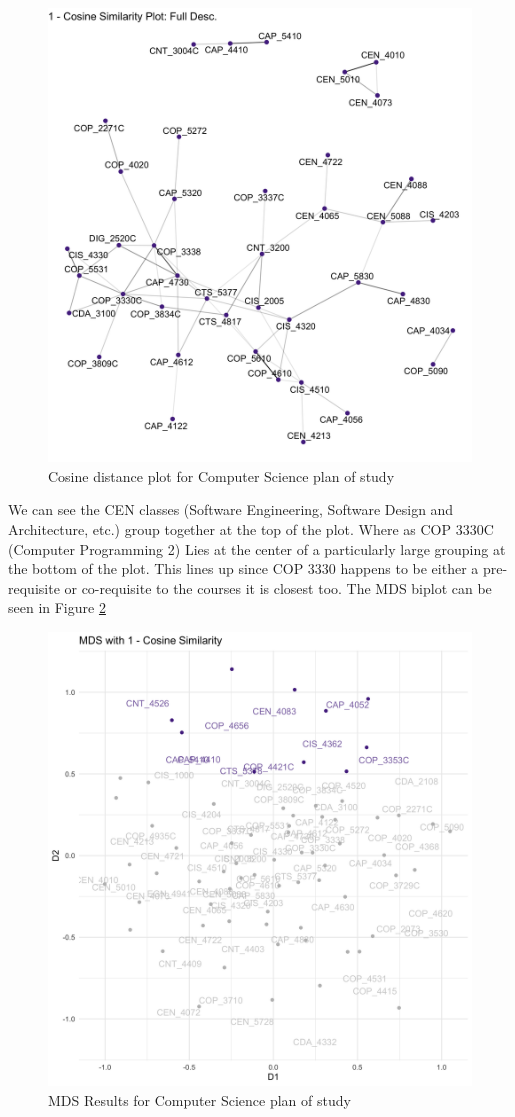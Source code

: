 \begin{figure}[H]
  \centering
  
  \includegraphics[width = .8\textwidth, height = .7\textheight]{Content/images/cos_cs.png}
  \caption{Cosine distance plot for Computer Science plan of study}
  \label{fig:cos_cs}
\end{figure}

We can see the CEN classes (Software Engineering, Software Design and Architecture, etc.) group together at the top of the plot. 
Where as COP 3330C (Computer Programming 2) Lies at the center of a particularly large grouping at the bottom of the plot. 
This lines up since COP 3330 happens to be either a pre-requisite or co-requisite to the courses it is closest too. The MDS 
biplot can be seen in Figure \ref{fig:cmds_cs}

\begin{figure}[H]
  \centering
  
  \includegraphics[width = .8\textwidth, height = .7\textheight]{Content/images/cos_mds_cs.png}
  \caption{MDS Results for Computer Science plan of study}
  \label{fig:cmds_cs}
\end{figure}

